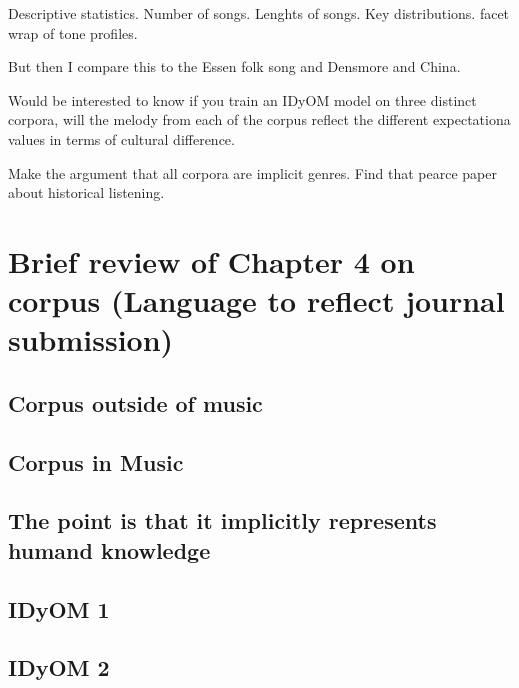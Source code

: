 \documentclass[]{book}
\begin{document}
Descriptive statistics.
Number of songs.
Lenghts of songs.
Key distributions.
facet wrap of tone profiles.

But then I compare this to the Essen folk song and Densmore and China.

Would be interested to know if you train an IDyOM model on three distinct corpora, will the melody from each of the corpus reflect the different expectationa values in terms of cultural difference.

Make the argument that all corpora are implicit genres.
Find that pearce paper about historical listening.

\hypertarget{brief-review-of-chapter-4-on-corpus-language-to-reflect-journal-submission}{%
\section{Brief review of Chapter 4 on corpus (Language to reflect journal submission)}\label{brief-review-of-chapter-4-on-corpus-language-to-reflect-journal-submission}}

\hypertarget{corpus-outside-of-music}{%
\subsection{Corpus outside of music}\label{corpus-outside-of-music}}

\hypertarget{corpus-in-music}{%
\subsection{Corpus in Music}\label{corpus-in-music}}

\hypertarget{the-point-is-that-it-implicitly-represents-humand-knowledge}{%
\subsection{The point is that it implicitly represents humand knowledge}\label{the-point-is-that-it-implicitly-represents-humand-knowledge}}

\hypertarget{idyom-1}{%
\subsection{IDyOM 1}\label{idyom-1}}

\hypertarget{idyom-2}{%
\subsection{IDyOM 2}\label{idyom-2}}
\end{document}
